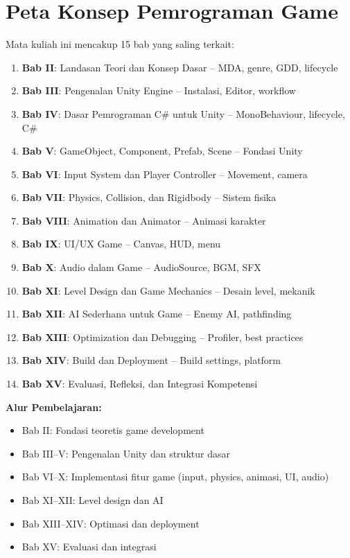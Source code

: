 \section{Peta Konsep Pemrograman Game}

Mata kuliah ini mencakup 15 bab yang saling terkait:

\begin{enumerate}
  \item \textbf{Bab II}: Landasan Teori dan Konsep Dasar -- MDA, genre, GDD, lifecycle
  \item \textbf{Bab III}: Pengenalan Unity Engine -- Instalasi, Editor, workflow
  \item \textbf{Bab IV}: Dasar Pemrograman C\# untuk Unity -- MonoBehaviour, lifecycle, C\#
  \item \textbf{Bab V}: GameObject, Component, Prefab, Scene -- Fondasi Unity
  \item \textbf{Bab VI}: Input System dan Player Controller -- Movement, camera
  \item \textbf{Bab VII}: Physics, Collision, dan Rigidbody -- Sistem fisika
  \item \textbf{Bab VIII}: Animation dan Animator -- Animasi karakter
  \item \textbf{Bab IX}: UI/UX Game -- Canvas, HUD, menu
  \item \textbf{Bab X}: Audio dalam Game -- AudioSource, BGM, SFX
  \item \textbf{Bab XI}: Level Design dan Game Mechanics -- Desain level, mekanik
  \item \textbf{Bab XII}: AI Sederhana untuk Game -- Enemy AI, pathfinding
  \item \textbf{Bab XIII}: Optimization dan Debugging -- Profiler, best practices
  \item \textbf{Bab XIV}: Build dan Deployment -- Build settings, platform
  \item \textbf{Bab XV}: Evaluasi, Refleksi, dan Integrasi Kompetensi
\end{enumerate}

\textbf{Alur Pembelajaran:}
\begin{itemize}
  \item Bab II: Fondasi teoretis game development
  \item Bab III--V: Pengenalan Unity dan struktur dasar
  \item Bab VI--X: Implementasi fitur game (input, physics, animasi, UI, audio)
  \item Bab XI--XII: Level design dan AI
  \item Bab XIII--XIV: Optimasi dan deployment
  \item Bab XV: Evaluasi dan integrasi
\end{itemize}
